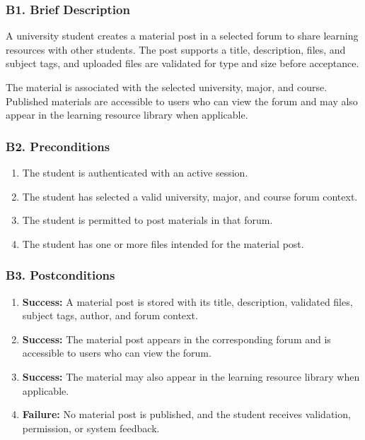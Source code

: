 \documentclass[12pt]{article}
\begin{document}
\hypertarget{sec:b1-brief-description}{}
\subsubsection*{B1. Brief Description}
\par\medskip

A university student creates a material post in a selected forum to share learning resources with other students. The post supports a title, description, files, and subject tags, and uploaded files are validated for type and size before acceptance.
\par\medskip

The material is associated with the selected university, major, and course. Published materials are accessible to users who can view the forum and may also appear in the learning resource library when applicable.
\par\medskip

\hypertarget{sec:b2-preconditions}{}
\subsubsection*{B2. Preconditions}
\par\medskip

\begin{enumerate}
\item The student is authenticated with an active session.
\item The student has selected a valid university, major, and course forum context.
\item The student is permitted to post materials in that forum.
\item The student has one or more files intended for the material post.
\end{enumerate}
\par\medskip

\hypertarget{sec:b3-postconditions}{}
\subsubsection*{B3. Postconditions}
\par\medskip

\begin{enumerate}
\item \textbf{Success:} A material post is stored with its title, description, validated files, subject tags, author, and forum context.
\item \textbf{Success:} The material post appears in the corresponding forum and is accessible to users who can view the forum.
\item \textbf{Success:} The material may also appear in the learning resource library when applicable.
\item \textbf{Failure:} No material post is published, and the student receives validation, permission, or system feedback.
\end{enumerate}
\par\medskip
\end{document}
